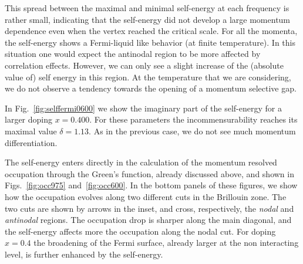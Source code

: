 This spread between the maximal and minimal self-energy at each frequency is rather small, indicating that the self-energy did not develop a large momentum dependence even when the vertex reached the critical scale. 
For all the momenta, the self-energy shows a Fermi-liquid like behavior (at finite temperature). 
In this situation one would expect the antinodal region to be more affected by correlation effects. 
However, we can only see a slight increase of the (absolute value of) self energy in this region. 
At the temperature that we are considering, we do not observe a tendency towards the opening of a momentum selective gap. 

In Fig.~\ref{fig:selffermi0600} we show the imaginary part of the self-energy for a larger doping $x=0.400$. For these parameters the incommensurability reaches its maximal value  $\delta=1.13$. 
As in the previous case, we do not see much momentum differentiation.

The self-energy enters directly in the calculation of the momentum resolved occupation through the Green's function, already discussed above, and shown in  Figs.~\ref{fig:occ975} and~\ref{fig:occ600}.
In the bottom panels of these figures,  we show how the occupation evolves along two different cuts in the Brillouin zone.
The two cuts are shown by arrows in the inset, and cross, respectively,  the \textit{nodal} and \textit{antinodal} regions.
The occupation drop is sharper along the main diagonal, and the self-energy affects more the occupation along the nodal cut.
For doping $x=0.4$ the broadening of the Fermi surface, already larger at the non interacting level, is further enhanced by the self-energy.

